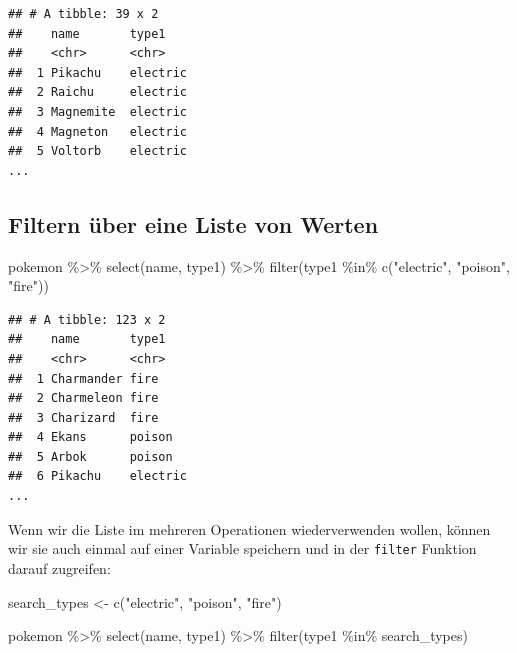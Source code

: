 \documentclass[
]{book}
\newenvironment{Shaded}{\begin{snugshade}}{\end{snugshade}}
\newcommand{\FunctionTok}[1]{\textcolor[rgb]{0.00,0.00,0.00}{#1}}
\newcommand{\NormalTok}[1]{#1}
\newcommand{\OtherTok}[1]{\textcolor[rgb]{0.56,0.35,0.01}{#1}}
\newcommand{\SpecialCharTok}[1]{\textcolor[rgb]{0.00,0.00,0.00}{#1}}
\newcommand{\StringTok}[1]{\textcolor[rgb]{0.31,0.60,0.02}{#1}}
\begin{document}
\begin{verbatim}
## # A tibble: 39 x 2
##    name       type1   
##    <chr>      <chr>   
##  1 Pikachu    electric
##  2 Raichu     electric
##  3 Magnemite  electric
##  4 Magneton   electric
##  5 Voltorb    electric
...
\end{verbatim}

\hypertarget{filtern-uxfcber-eine-liste-von-werten}{%
\subsection{Filtern über eine Liste von Werten}\label{filtern-uxfcber-eine-liste-von-werten}}

\begin{Shaded}
\begin{Highlighting}[]
\NormalTok{pokemon }\SpecialCharTok{\%\textgreater{}\%}
  \FunctionTok{select}\NormalTok{(name, type1) }\SpecialCharTok{\%\textgreater{}\%}
  \FunctionTok{filter}\NormalTok{(type1 }\SpecialCharTok{\%in\%} \FunctionTok{c}\NormalTok{(}\StringTok{"electric"}\NormalTok{, }\StringTok{"poison"}\NormalTok{, }\StringTok{"fire"}\NormalTok{))}
\end{Highlighting}
\end{Shaded}

\begin{verbatim}
## # A tibble: 123 x 2
##    name       type1   
##    <chr>      <chr>   
##  1 Charmander fire    
##  2 Charmeleon fire    
##  3 Charizard  fire    
##  4 Ekans      poison  
##  5 Arbok      poison  
##  6 Pikachu    electric
...
\end{verbatim}

Wenn wir die Liste im mehreren Operationen wiederverwenden wollen, können wir sie auch einmal auf einer Variable speichern und in der \texttt{filter} Funktion darauf zugreifen:

\begin{Shaded}
\begin{Highlighting}[]
\NormalTok{search\_types }\OtherTok{\textless{}{-}} \FunctionTok{c}\NormalTok{(}\StringTok{"electric"}\NormalTok{, }\StringTok{"poison"}\NormalTok{, }\StringTok{"fire"}\NormalTok{)}

\NormalTok{pokemon }\SpecialCharTok{\%\textgreater{}\%}
  \FunctionTok{select}\NormalTok{(name, type1) }\SpecialCharTok{\%\textgreater{}\%}
  \FunctionTok{filter}\NormalTok{(type1 }\SpecialCharTok{\%in\%}\NormalTok{ search\_types)}
\end{Highlighting}
\end{Shaded}
\end{document}
